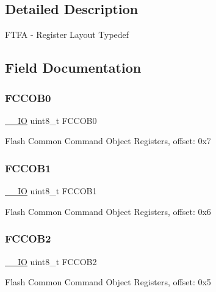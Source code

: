 \subsection{Detailed Description}
F\+T\+FA -\/ Register Layout Typedef 

\subsection{Field Documentation}
\mbox{\label{struct_f_t_f_a___type_a339e554f6ce0e1633a1e07f5ee9fd2ca}} 
\subsubsection{\texorpdfstring{FCCOB0}{FCCOB0}}
{\footnotesize\ttfamily \mbox{\hyperlink{core__cm0plus_8h_aec43007d9998a0a0e01faede4133d6be}{\+\_\+\+\_\+\+IO}} uint8\+\_\+t F\+C\+C\+O\+B0}

Flash Common Command Object Registers, offset\+: 0x7 \mbox{\label{struct_f_t_f_a___type_a3b45993d28df53171645290c45bdb55c}} 
\subsubsection{\texorpdfstring{FCCOB1}{FCCOB1}}
{\footnotesize\ttfamily \mbox{\hyperlink{core__cm0plus_8h_aec43007d9998a0a0e01faede4133d6be}{\+\_\+\+\_\+\+IO}} uint8\+\_\+t F\+C\+C\+O\+B1}

Flash Common Command Object Registers, offset\+: 0x6 \mbox{\label{struct_f_t_f_a___type_a70dba78a9955734512a852eeea205781}} 
\subsubsection{\texorpdfstring{FCCOB2}{FCCOB2}}
{\footnotesize\ttfamily \mbox{\hyperlink{core__cm0plus_8h_aec43007d9998a0a0e01faede4133d6be}{\+\_\+\+\_\+\+IO}} uint8\+\_\+t F\+C\+C\+O\+B2}

Flash Common Command Object Registers, offset\+: 0x5 \mbox{\label{struct_f_t_f_a___type_a9a966008c6b3e9777985b820a50c7634}} 
